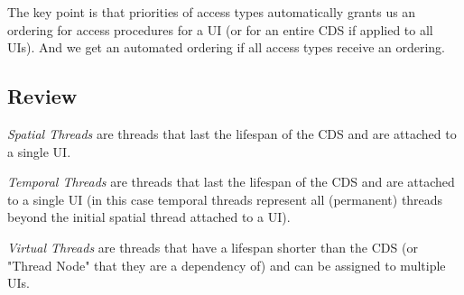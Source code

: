 The key point is that priorities of access types automatically grants us an ordering for access procedures for a UI (or for an entire CDS if applied to all UIs). And we get an automated ordering if all access types receive an ordering.

\subsection{Review}

\begin{con-def}
	\label{spatial-threads}
	\textit{Spatial Threads} are threads that last the lifespan of the CDS and are attached to a single UI.
\end{con-def}

\begin{con-def}
	\label{temporal-threads}
	\textit{Temporal Threads} are threads that last the lifespan of the CDS and are attached to a single UI (in this case temporal threads represent all (permanent) threads beyond the initial spatial thread attached to a UI).
\end{con-def}

\begin{con-def}
	\label{virtual-threads}
	\textit{Virtual Threads} are threads that have a lifespan shorter than the CDS (or "Thread Node" that they are a dependency of) and can be assigned to multiple UIs.
\end{con-def}